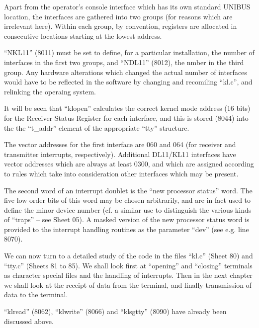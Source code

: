 Apart from the operator's console
interface which has its own standard
UNIBUS location, the interfaces are
gathered into two groups (for reasons
which are irrelevant here). Within
each group, by convention, registers
are allocated in consecutive locations
starting at the lowest address.


``NKL11'' (8011) must be set to define,
for a particular installation, the
number of interfaces in the first two
groups, and ``NDL11'' (8012), the nmber
in the third group. Any hardware
alterations which changed the actual
number of interfaces would have to be
reflected in the software by changing
and recomiling ``kl.c'', and relinking
the operaing system.

It will be seen that ``klopen'' calculates the correct kernel mode address
(16 bits) for the Receiver Status
Register for each interface, and this
is stored (8044) into the the ``t\_addr''
element of the appropriate ``tty'' structure.


The vector addresses for the first
interface are 060 and 064 (for receiver
and transmitter interrupts, respectively).
Additional DL11/KL11 interfaces have vector addresses which are
always at least 0300, and which are
assigned according to rules which take
into consideration other interfaces
which may be present.

The second word of an interrupt doublet
is the ``new processor status'' word. The
five low order bits of this word may be
chosen arbitrarily, and are in fact
used to define the minor device number
(cf. a similar use to distinguish the
various kinds of ``traps'' -- see Sheet
05). A masked version of the new processor status word is provided to the
interrupt handling routines as the
parameter ``dev'' (see e.g. line 8070).


We can now turn to a detailed study of
the code in the files ``kl.c'' (Sheet 80)
and ``tty.c'' (Sheets 81 to 85). We
shall look first at ``opening'' and
``closing'' terminals as character
special files and the handling of interrupts. Then in the next chapter we
shall look at the receipt of data from
the terminal, and finally transmission
of data to the terminal.

``klread'' (8062), ``klwrite'' (8066) and
``klsgtty'' (8090) have already been discussed above.


